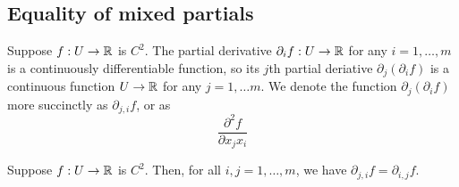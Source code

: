 \subsection{Equality of mixed partials \starred}

\begin{definition} 
	Suppose $f : U \to \mathbb{R}$ is $C^2$. The partial derivative $\partial_i f : U \to \mathbb{R}$ for any $i = 1, \dotsc, m$ is a continuously differentiable function, so its $j$th partial deriative $\partial_j( \partial_i f)$ is a continuous function $U \to \mathbb{R}$ for any $j = 1, \dotsc m$. We denote the function $\partial_j(\partial_i f)$ more succinctly as $\partial_{j,i} f$, or as
	\[ \frac{\partial^2 f}{\partial x_j x_i} \]
\end{definition}

\begin{theorem} \label{mixed-partials} 
	Suppose $f : U \to \mathbb{R}$ is $C^2$. Then, for all $i, j = 1, \dotsc, m$, we have $\partial_{j,i} f = \partial_{i,j} f$.
\end{theorem}

